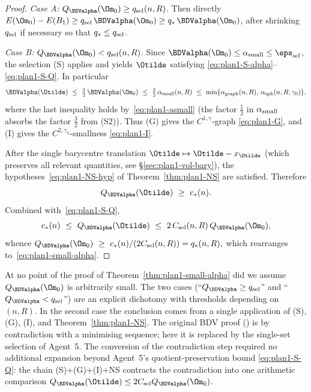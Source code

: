 \begin{proof}
\emph{Case A:} $Q_{\BDValpha}(\Om_{0})\ge q_{\rm sel}(n,R)$. Then directly
$E(\Om_{0})-E(B_{1})\ge q_{\rm sel}\,\BDValpha(\Om_{0})\ge q_{*}\,\BDValpha(\Om_{0})$,
after shrinking $q_{\rm sel}$ if necessary so that $q_{*}\le q_{\rm sel}$.

\emph{Case B:} $Q_{\BDValpha}(\Om_{0})<q_{\rm sel}(n,R)$. Since
$\BDValpha(\Om_{0})\le\alpha_{\rm small}\le\eps_{\rm sel}$, the
selection (S) applies and yields $\Otilde$ satisfying
\eqref{eq:plan1-S-alpha}--\eqref{eq:plan1-S-Q}. In particular
\[
   \BDValpha(\Otilde)\ \le\
   \tfrac{3}{2}\,\BDValpha(\Om_{0})
   \ \le\ \tfrac{3}{2}\,\alpha_{\rm small}(n,R)
   \ \le\ \min\{\alpha_{\rm graph}(n,R),\,\alpha_{\rm sph}(n,R,\gamma_{0})\},
\]
where the last inequality holds by~\eqref{eq:plan1-asmall} (the factor
$\tfrac{1}{2}$ in $\alpha_{\rm small}$ absorbs the factor $\tfrac{3}{2}$
from (S2)). Thus (G) gives the $C^{1,\gamma}$-graph
\eqref{eq:plan1-G}, and (I) gives the $C^{2,\gamma_{0}}$-smallness
\eqref{eq:plan1-I}.

After the single barycentre translation
$\Otilde\mapsto\Otilde-x_{\Otilde}$ (which preserves all relevant
quantities, see \S\ref{sec:plan1-vol-bary}), the
hypotheses~\eqref{eq:plan1-NS-hyp} of Theorem~\ref{thm:plan1-NS} are
satisfied. Therefore
\[
   Q_{\BDValpha}(\Otilde)\ \ge\ c_{*}(n).
\]
Combined with~\eqref{eq:plan1-S-Q},
\[
   c_{*}(n)\ \le\ Q_{\BDValpha}(\Otilde)\ \le\
   2\,C_{\rm sel}(n,R)\,Q_{\BDValpha}(\Om_{0}),
\]
whence
\(
   Q_{\BDValpha}(\Om_{0})\ \ge\ c_{*}(n)/(2C_{\rm sel}(n,R))=q_{*}(n,R),
\)
which rearranges to~\eqref{eq:plan1-small-alpha}.
\end{proof}

\begin{remark}\label{rem:plan1-no-contradiction}
At no point of the proof of Theorem~\ref{thm:plan1-small-alpha} did we
assume $Q_{\BDValpha}(\Om_{0})$ is arbitrarily small. The two cases
(``$Q_{\BDValpha}\ge q_{\rm sel}$'' and ``$Q_{\BDValpha}<q_{\rm sel}$'')
are an explicit dichotomy with thresholds depending on $(n,R)$. In the
second case the conclusion comes from a single application of (S), (G),
(I), and Theorem~\ref{thm:plan1-NS}. The original BDV proof
(\cite[Theorem~4.3]{BDV}) is by contradiction with a minimising
sequence; here it is replaced by the single-set selection of Agent~5.
The conversion of the contradiction step required no additional
expansion beyond Agent~5's quotient-preservation bound
\eqref{eq:plan1-S-Q}: the chain (S)+(G)+(I)+NS contracts the
contradiction into one arithmetic comparison
$Q_{\BDValpha}(\Otilde)\le 2C_{\rm sel}Q_{\BDValpha}(\Om_{0})$.
\end{remark}


